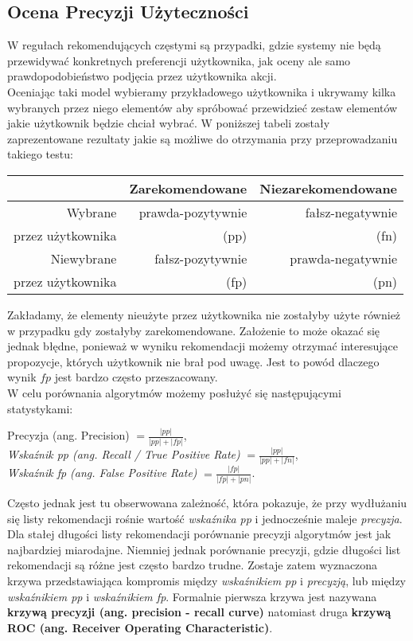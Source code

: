\documentclass[12pt,a4paper]{report}
\begin{document}
\subsection{Ocena Precyzji Użyteczności}
W regułach rekomendujących częstymi są przypadki, gdzie systemy nie będą przewidywać konkretnych preferencji użytkownika, jak oceny ale samo prawdopodobieństwo podjęcia przez użytkownika akcji.
\\Oceniając taki model wybieramy przykładowego użytkownika i ukrywamy kilka wybranych przez niego elementów aby spróbować przewidzieć zestaw elementów jakie użytkownik będzie chciał wybrać. W poniższej tabeli zostały zaprezentowane rezultaty jakie są możliwe do otrzymania przy przeprowadzaniu takiego testu:
\begin{center}
\begin{tabular}{|r|r|r|} \hline
 & Zarekomendowane & Niezarekomendowane  \\
\hline 
Wybrane & prawda-pozytywnie & fałsz-negatywnie \\
przez użytkownika &(pp)&(fn) \\
\hline
Niewybrane & fałsz-pozytywnie & prawda-negatywnie \\
przez użytkownika &(fp)&(pn) \\
\hline
\end{tabular}
\end{center}
Zakładamy, że elementy nieużyte przez użytkownika nie zostałyby użyte również w przypadku gdy zostałyby zarekomendowane. Założenie to może okazać się jednak błędne, ponieważ w wyniku rekomendacji możemy otrzymać interesujące propozycje, których użytkownik nie brał pod uwagę. Jest to powód dlaczego wynik $fp$ jest bardzo często przeszacowany.
\\W celu porównania algorytmów możemy posłużyć się następującymi statystykami:
\begin{center}
Precyzja (ang. Precision) $= \frac{|pp|}{|pp|+|fp|}$, %
\\\textit{Wskaźnik pp (ang. Recall / True Positive Rate)} $ = \frac{|pp|}{|pp|+|fn|}$,
\\\textit{Wskaźnik fp (ang. False Positive Rate)} $ = \frac{|fp|}{|fp|+|pn|}$.
\end{center}
Często jednak jest tu obserwowana zależność, która pokazuje, że przy wydłużaniu się listy rekomendacji rośnie wartość \textit{wskaźnika pp} i jednocześnie maleje \textit{precyzja}. Dla stałej długości listy rekomendacji porównanie precyzji algorytmów jest jak najbardziej miarodajne. Niemniej jednak porównanie precyzji, gdzie długości list rekomendacji są różne jest często bardzo trudne. Zostaje zatem wyznaczona krzywa przedstawiająca kompromis między \textit{wskaźnikiem pp} i \textit{precyzją}, lub między \textit{wskaźnikiem pp} i \textit{wskaźnikiem fp}. Formalnie pierwsza krzywa jest nazywana \textbf{krzywą precyzji (ang. precision - recall curve)} natomiast druga \textbf{krzywą ROC (ang. Receiver Operating Characteristic)}.
\end{document}

